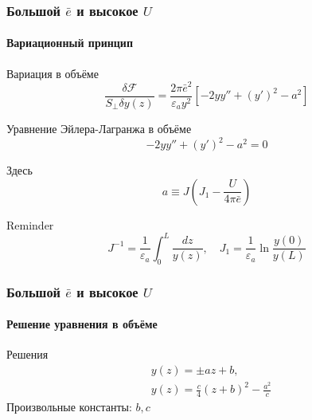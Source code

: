 \documentclass[utf8,secheader]{beamer}
\newcommand{\FF}{\mathcal{F}}
\begin{document}
\begin{frame}
\frametitle{Большой $\bar{e}$ и высокое $U$}
\framesubtitle{Вариационный принцип}
\begin{block}{Вариация в объёме}
\begin{equation}
\frac{\delta \FF}{S_\bot\delta y(z)} = \frac{2\pi\bar{e}^2}{\varepsilon_a y^2}\left[ -2yy'' + (y')^2 - a^2 \right]
\end{equation}
\end{block}
\begin{block}{Уравнение Эйлера-Лагранжа в объёме}
\begin{equation}
-2yy'' + (y')^2 - a^2 = 0
\end{equation}
\end{block}
Здесь
\begin{equation}
a \equiv J\left(J_1 - \frac{U}{4\pi \bar{e}}\right)
\end{equation}
\begin{block}{Reminder}
\begin{equation}
J^{-1} =\frac{1}{\varepsilon_a}\int_0^L \frac{dz}{y(z)}, \quad J_1 = \frac{1}{\varepsilon_a} \ln \frac{y(0)}{y(L)}
\end{equation}
\end{block}
\end{frame}



\begin{frame}
\frametitle{Большой $\bar{e}$ и высокое $U$}
\framesubtitle{Решение уравнения в объёме}
\begin{block}{Решения}
\begin{align}
&y(z) = \pm az + b, \\
&y(z) = \frac{c}{4} \left(z + b\right)^2 - \frac{a^2}{c}
\end{align}
Произвольные константы: $b, c$
\end{block}
\end{frame}
\end{document}
